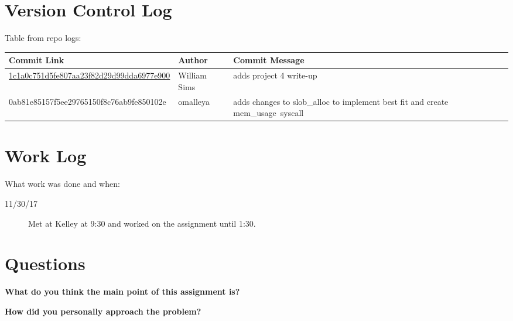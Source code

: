 \documentclass[10pt,letterpaper,draftclsnofoot,onecolumn]{IEEEtran}
\begin{document}
\section{Version Control Log}
\noindent Table from repo logs:

\begin{center}
    \begin{tabular}{ | p{8cm} | p{3cm} | p{6cm} |}
    \hline
    Commit Link & Author & Commit Message \\ \hline
    \href{https://github.com/omalleya/cs444-concurrency-writeups/commit/1c1a0c751d5fe807aa23f82d29d99dda6977e900}{1c1a0c751d5fe807aa23f82d29d99dda6977e900} & William Sims & adds project 4 write-up \\ \hline
    0ab81e85157f5ee29765150f8c76ab9fe850102e & omalleya & adds changes to slob\_alloc to implement best fit and create mem\_usage\ syscall \\ \hline
 
    \end{tabular}
\end{center}

\section{Work Log}
\noindent What work was done and when:
\begin{description}
\item [11/30/17] Met at Kelley at 9:30 and worked on the assignment until 1:30.

\end{description}

\section{Questions}

\noindent\textbf{What do you think the main point of this assignment is?}


\noindent\textbf{How did you personally approach the problem?}
\end{document}
